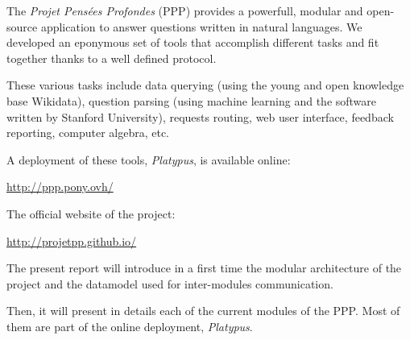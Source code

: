 The \emph{Projet Pensées Profondes} (PPP) provides a powerfull,
modular and open-source application to answer questions written in natural languages.
We developed an eponymous set of tools that accomplish different tasks and fit
together thanks to a well defined protocol.

These various tasks include data querying (using the young and open
knowledge base Wikidata), question parsing (using machine learning and the
\CoreNLP software written by Stanford University),
requests routing, web user interface, feedback reporting, computer algebra, etc.

A deployment of these tools, \emph{Platypus}, is available online:

\begin{center}
    \url{http://ppp.pony.ovh/}
\end{center}

The official website of the project:

\begin{center}
    \url{http://projetpp.github.io/}
\end{center}

\medbreak

The present report will introduce in a first time the modular architecture of the
project and the datamodel used for inter-modules communication.

Then, it will present in details each of the current modules of the PPP. Most of
them are part of the online deployment, \emph{Platypus}.
